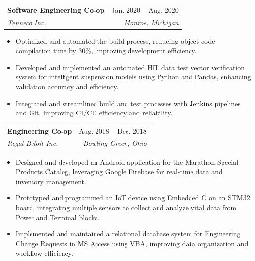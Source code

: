 \documentclass[letterpaper,11pt]{article}
\makeatletter
\newcommand{\resumeItem}[1]{
  \item\small{
    {#1 \vspace{-2pt}}
  }
}
\newcommand{\resumeSubheading}[4]{
  \vspace{-2pt}\item
    \begin{tabular*}{0.97\textwidth}[t]{l@{\extracolsep{\fill}}r}
      \textbf{#1} & #2 \\
      \textit{\small#3} & \textit{\small #4} \\
      
    \end{tabular*}\vspace{-7pt}
}
\newcommand{\resumeItemListStart}{\begin{itemize}}
\newcommand{\resumeItemListEnd}{\end{itemize}\vspace{-5pt}}
\makeatother
\begin{document}
    

    \resumeSubheading
      {Software Engineering Co-op  }{Jan. 2020 -- Aug. 2020}
      {Tenneco Inc. }{Monroe, Michigan}
      \resumeItemListStart
        \resumeItem{Optimized and automated the build process, reducing object code compilation time by 30\%, improving development efficiency.}
        \resumeItem{Developed and implemented an automated HIL data test vector verification system for intelligent suspension models using Python and Pandas, enhancing validation accuracy and efficiency. }
        \resumeItem{Integrated and streamlined build and test processes with Jenkins pipelines and Git, improving CI/CD efficiency and reliability.}
        
      \resumeItemListEnd

     \resumeSubheading
      {Engineering Co-op}{Aug. 2018 -- Dec. 2018}
      {Regal Beloit Inc. }{Bowling Green, Ohio}
      \resumeItemListStart
        \resumeItem{Designed and developed an Android application for the Marathon Special Products Catalog, leveraging Google Firebase for real-time data and inventory management.}
        \resumeItem{Prototyped and programmed an IoT device using Embedded C on an STM32 board, integrating multiple sensors to collect and analyze vital data from Power and Terminal blocks.}
        \resumeItem{Implemented and maintained a relational database system for Engineering Change Requests in MS Access using VBA, improving data organization and workflow efficiency.}
        
      \resumeItemListEnd
    
\end{document}
